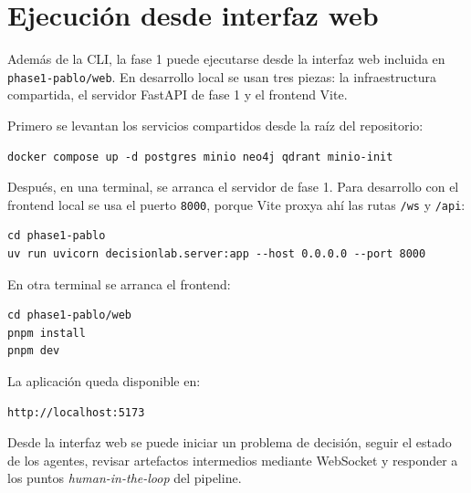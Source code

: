 \section{Ejecución desde interfaz web}

Además de la CLI, la fase 1 puede ejecutarse desde la interfaz web incluida en
\texttt{phase1-pablo/web}. En desarrollo local se usan tres piezas: la
infraestructura compartida, el servidor FastAPI de fase 1 y el frontend Vite.

Primero se levantan los servicios compartidos desde la raíz del repositorio:

\begin{verbatim}
docker compose up -d postgres minio neo4j qdrant minio-init
\end{verbatim}

Después, en una terminal, se arranca el servidor de fase 1. Para desarrollo con
el frontend local se usa el puerto \texttt{8000}, porque Vite proxya ahí las
rutas \texttt{/ws} y \texttt{/api}:

\begin{verbatim}
cd phase1-pablo
uv run uvicorn decisionlab.server:app --host 0.0.0.0 --port 8000
\end{verbatim}

En otra terminal se arranca el frontend:

\begin{verbatim}
cd phase1-pablo/web
pnpm install
pnpm dev
\end{verbatim}

La aplicación queda disponible en:

\begin{verbatim}
http://localhost:5173
\end{verbatim}

Desde la interfaz web se puede iniciar un problema de decisión, seguir el estado
de los agentes, revisar artefactos intermedios mediante WebSocket y responder a
los puntos \textit{human-in-the-loop} del pipeline.
